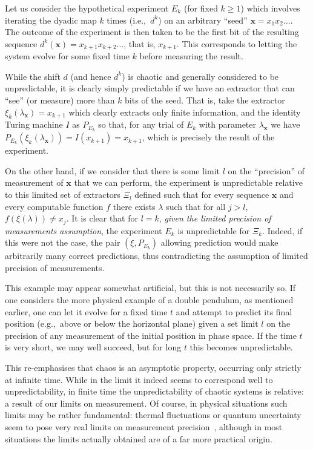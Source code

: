\documentclass[information,article,submit,moreauthors,pdftex,12pt,a4paper]{mdpi}
\theoremstyle{mdpi}
\newcounter{ex}
\newcounter{re}
\theoremstyle{mdpidefinition}
\newcommand{\x}{\mathbf{x}}
\begin{document}
Let us consider the hypothetical experiment $E_k$  (for fixed $k\ge 1$) which  involves iterating the dyadic map $k$ times (i.e.,\ $d^k$) on an arbitrary ``seed'' $\x=x_1x_2\dots$.
The outcome of the experiment is then taken to be the first bit of the resulting sequence $d^k(\x)=x_{k+1}x_{k+2}\dots$, that is, $x_{k+1}$.
This corresponds to letting the system evolve for some fixed time $k$ before measuring the result.

While the shift $d$ (and hence $d^k$) is chaotic and generally considered to be unpredictable, it is clearly simply predictable if we have an extractor that can ``see'' (or measure) more than $k$ bits of the seed.
That is, take the extractor $\xi_k(\lambda_\x) = x_{k+1}$ which clearly extracts only finite information, and the identity Turing machine $I$ as $P_{E_k}$ so that, for any trial of $E_k$ with parameter $\lambda_\x$ we have $P_{E_k}(\xi_k(\lambda_\x)) = I(x_{k+1})=x_{k+1}$, which is precisely the result of the experiment.


On the other hand, if we consider that there is some limit $l$ on the ``precision''  of measurement of $\x$ that we can perform, the experiment is unpredictable relative to this limited set of extractors $\Xi_l$ defined  such that for every sequence $\x$ and every computable function $f$  there exists $\lambda$ such that for all
$j>l$, $f(\xi(\lambda))\not=x_j$. It is clear that for $l=k$, \emph{given the limited precision of measurements assumption},
the experiment $E_k$ is unpredictable for $\Xi_k$. Indeed,   if this were not the case, the pair $(\xi,P_{E_k})$ allowing prediction would make arbitrarily many correct predictions, thus  contradicting the assumption of limited precision of measurements.

This example may appear somewhat artificial, but this is not necessarily so.
If one considers the more physical example of a double pendulum, as mentioned earlier, one can let  it evolve for a fixed time $t$ and attempt to predict its final position (e.g.,\ above or below the horizontal plane) given a set limit $l$ on the precision of any measurement of the initial position in phase space.
If the time $t$ is very short, we may well succeed, but for long $t$ this becomes unpredictable.

This re-emphasises that chaos is an asymptotic property, occurring only strictly at infinite time.
While in the limit it indeed seems to correspond well to unpredictability, in finite time the unpredictability of chaotic systems is relative: a result of our limits on measurement.
Of course, in physical situations such limits may be rather fundamental: thermal fluctuations or quantum uncertainty seem to pose very real limits on measurement precision~\cite{Longo:2008ud}, although in most situations the limits actually obtained are of a far more practical origin.
\end{document}
